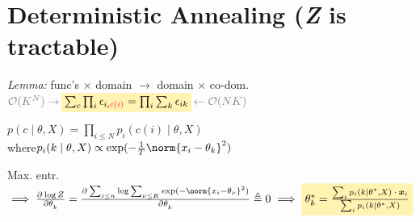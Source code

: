\section{Deterministic Annealing
\hfill\normalfont\sffamily (\textit{\rmfamily Z} is tractable)}

\emph{Lemma:}\enspace
func's $\times$ domain $\to$ domain $\times$ co-dom.\\
\quad $\textcolor{gray}{\mathcal O(K^N) \rightarrow\,}
\highlight{\sum_c \prod_i \epsilon_{i, \color{red} c(i)} = \prod_i \sum_k \epsilon_{ik}}
\textcolor{gray}{\,\leftarrow \mathcal O(NK)}$

$p(c\mid \theta, X) = \prod_{i\leq N} p_i(c(i) \mid \theta,X)$\\
\quad where\enskip $p_i(k\mid \theta, X) \propto \exp(-\frac1T \norm{x_i - \theta_k}^2)$

Max. entr.
$\implies \pderiv{\log Z}{\theta_k} = \pderiv{\sum_{i\leq n} \log\sum_{\nu\leq K}\exp(-\norm{x_i-\theta_{\nu}}^2)}{\theta_k} \triangleq0
\implies \highlight{\theta_k^\ast = \frac{ \sum_i p_i(k\mid \theta^\ast, X) \:\cdot\: \bm x_i }{ \sum_i p_i(k\mid \theta^\ast, X) }}$


